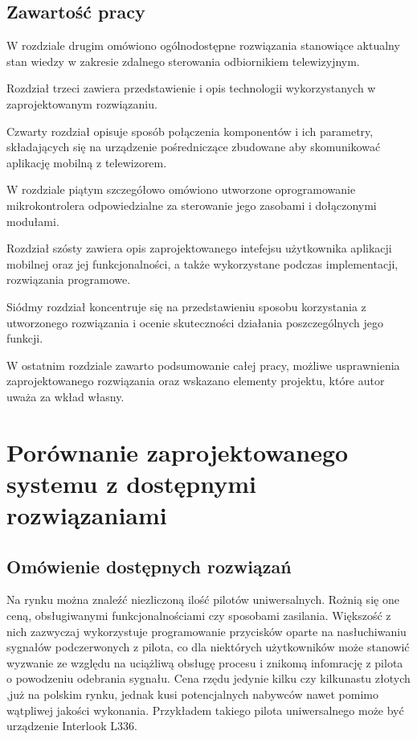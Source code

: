 \documentclass[12pt,twoside]{article}
\begin{document}
\subsection{Zawartość pracy}
W rozdziale drugim  omówiono ogólnodostępne rozwiązania stanowiące aktualny stan wiedzy w zakresie zdalnego sterowania odbiornikiem telewizyjnym.

Rozdział trzeci zawiera przedstawienie i opis technologii wykorzystanych w zaprojektowanym rozwiązaniu.

Czwarty rozdział opisuje sposób połączenia komponentów i ich parametry, składających się na urządzenie pośredniczące zbudowane aby skomunikować aplikację mobilną z telewizorem.

W rozdziale piątym szczegółowo omówiono utworzone oprogramowanie mikrokontrolera odpowiedzialne za sterowanie jego zasobami i dołączonymi modułami.

Rozdział szósty zawiera opis zaprojektowanego intefejsu użytkownika aplikacji mobilnej oraz jej funkcjonalności, a także wykorzystane podczas implementacji, rozwiązania programowe.

Siódmy rozdział koncentruje się na przedstawieniu sposobu korzystania z utworzonego rozwiązania i ocenie skuteczności działania poszczególnych jego funkcji.

W ostatnim rozdziale zawarto podsumowanie całej pracy, możliwe usprawnienia zaprojektowanego rozwiązania oraz wskazano elementy projektu, które autor uważa za wkład własny.


\clearpage
\section{Porównanie zaprojektowanego systemu z do\-stęp\-ny\-mi rozwiązaniami}
\subsection{Omówienie dostępnych rozwiązań}
Na rynku można znaleźć niezliczoną ilość pilotów uniwersalnych. Rożnią się one
ceną, obsługiwanymi funkcjonalnościami czy sposobami zasilania. Większość z nich zazwyczaj
wykorzystuje programowanie przycisków oparte na nasłuchiwaniu sygnałów podczerwonych z pilota, co dla niektórych użytkowników może stanowić
wyzwanie ze względu na uciążliwą obsługę procesu i znikomą infomrację z pilota o powodzeniu odebrania sygnału. Cena rzędu jedynie kilku czy kilkunastu złotych
,już na polskim rynku, jednak kusi potencjalnych nabywców nawet pomimo wątpliwej jakości wykonania. Przykładem
takiego pilota uniwersalnego może być urządzenie Interlook L336\cite{cheapController}.
\end{document}
